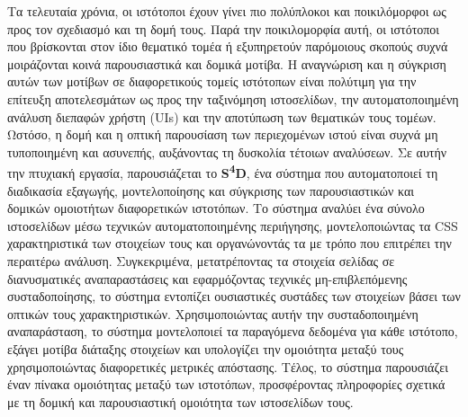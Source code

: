 
Τα τελευταία χρόνια, οι ιστότοποι έχουν γίνει πιο πολύπλοκοι και ποικιλόμορφοι ως προς τον σχεδιασμό και τη δομή τους. Παρά την ποικιλομορφία αυτή, οι ιστότοποι που βρίσκονται στον ίδιο θεματικό τομέα ή εξυπηρετούν παρόμοιους σκοπούς συχνά μοιράζονται κοινά παρουσιαστικά και δομικά μοτίβα. Η αναγνώριση και η σύγκριση αυτών των μοτίβων σε διαφορετικούς τομείς ιστότοπων είναι πολύτιμη για την επίτευξη αποτελεσμάτων ως προς την ταξινόμηση ιστοσελίδων, την αυτοματοποιημένη ανάλυση διεπαφών χρήστη \textlatin{(UIs)} και την αποτύπωση των θεματικών τους τομέων. Ωστόσο, η δομή και η οπτική παρουσίαση των περιεχομένων ιστού είναι συχνά μη τυποποιημένη και ασυνεπής, αυξάνοντας τη δυσκολία τέτοιων αναλύσεων. Σε αυτήν την πτυχιακή εργασία, παρουσιάζεται το \textlatin{\textbf{S\textsuperscript{4}D}}, ένα σύστημα που αυτοματοποιεί τη διαδικασία εξαγωγής, μοντελοποίησης και σύγκρισης των παρουσιαστικών και δομικών ομοιοτήτων διαφορετικών ιστοτόπων. Το σύστημα αναλύει ένα σύνολο ιστοσελίδων μέσω τεχνικών αυτοματοποιημένης περιήγησης, μοντελοποιώντας τα \textlatin{CSS} χαρακτηριστικά των στοιχείων τους και οργανώνοντάς τα με τρόπο που επιτρέπει την περαιτέρω ανάλυση. Συγκεκριμένα, μετατρέποντας τα στοιχεία σελίδας σε διανυσματικές αναπαραστάσεις και εφαρμόζοντας τεχνικές μη-επιβλεπόμενης συσταδοποίησης, το σύστημα εντοπίζει ουσιαστικές συστάδες των στοιχείων βάσει των οπτικών τους χαρακτηριστικών. Χρησιμοποιώντας αυτήν την συσταδοποιημένη αναπαράσταση, το σύστημα μοντελοποιεί τα παραγόμενα δεδομένα για κάθε ιστότοπο, εξάγει μοτίβα διάταξης στοιχείων και υπολογίζει την ομοιότητα μεταξύ τους χρησιμοποιώντας διαφορετικές μετρικές απόστασης. Τέλος, το σύστημα παρουσιάζει έναν πίνακα ομοιότητας μεταξύ των ιστοτόπων, προσφέροντας πληροφορίες σχετικά με τη δομική και παρουσιαστική ομοιότητα των ιστοσελίδων τους.

